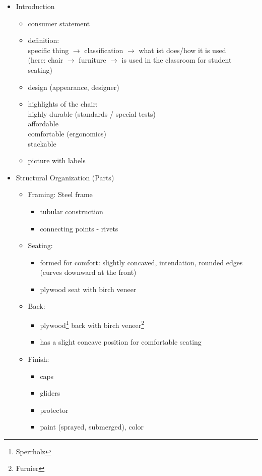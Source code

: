 \documentclass{scrreprt}
\begin{document}
\begin{itemize}
\item Introduction
\begin{itemize}
\item consumer statement
\item definition:\\
specific thing $\to$ classification $\to$ what ist does/how it is used\\
(here: chair $\to$ furniture $\to$ is used in the classroom for student seating)
\item design (appearance, designer)
\item highlights of the chair:\\
highly durable (standards / special tests)\\
affordable\\
comfortable (ergonomics)\\
stackable
\item picture with labels
\end{itemize}
\item Structural Organization (Parts)
\begin{itemize}
\item Framing: Steel frame
\begin{itemize}
\item tubular construction
\item connecting points - rivets
\end{itemize}
\item Seating:
\begin{itemize}
\item formed for comfort: slightly concaved, intendation, rounded edges (curves downward at the front)
\item plywood seat with birch veneer
\end{itemize} 
\item Back:
\begin{itemize}
\item plywood\footnote{Sperrholz} back with birch veneer\footnote{Furnier}
\item has a slight concave position for comfortable seating
\end{itemize}
\item Finish: 
\begin{itemize}
\item caps
\item gliders
\item protector
\item paint (sprayed, submerged), color

\end{itemize}
\end{itemize}
\end{itemize}
\end{document}
